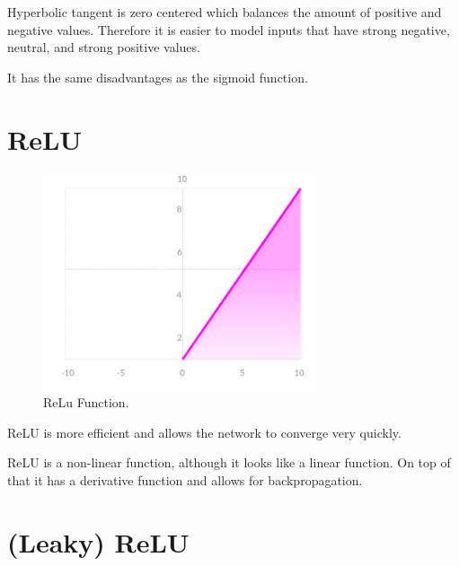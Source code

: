 \documentclass[a4paper,13pt,twoside]{book}
\begin{document}
Hyperbolic tangent is zero centered which balances the amount of positive and negative values. Therefore it is easier to model inputs that have strong negative, neutral, and strong positive values.

It has the same disadvantages as the sigmoid function.

\section{ReLU}

\begin{figure}[H]
  \includegraphics[width=\linewidth]{Images/ReLu.png}
  \caption{ReLu Function.}
  \label{fig:ReLu Function}
\end{figure}


ReLU is more efficient and allows the network to converge very quickly.

ReLU is a non-linear function, although it looks like a linear function. On top of that it has a derivative function and allows for backpropagation.

\section{(Leaky) ReLU}
\end{document}
